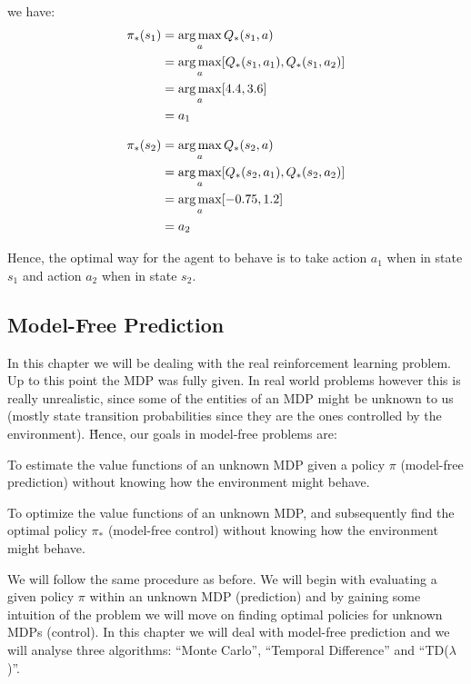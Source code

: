 we have:
\begin{align*}
\pi_*(s_1) &= \operatorname*{arg\,max}_{a} Q_*(s_1,a) \\
&= \operatorname*{arg\,max}_{a} [Q_*(s_1,a_1), Q_*(s_1,a_2)] \\
&= \operatorname*{arg\,max}_{a} [4.4, 3.6] \\
&= a_1
\end{align*}

\vspace{-15pt}

\begin{align*}
\pi_*(s_2) &= \operatorname*{arg\,max}_{a} Q_*(s_2,a) \\
&= \operatorname*{arg\,max}_{a} [Q_*(s_2,a_1), Q_*(s_2,a_2)] \\
&= \operatorname*{arg\,max}_{a} [-0.75, 1.2] \\
&= a_2
\end{align*}

Hence, the optimal way for the agent to behave is to take action $a_1$ when in state $s_1$ and action $a_2$ when in
state $s_2$.

\subsection{Model-Free Prediction}

In this chapter we will be dealing with the real reinforcement learning problem. Up to this point the MDP was fully
given. In real world problems however this is really unrealistic, since some of the entities of an MDP might be
unknown to us (mostly state transition probabilities since they are the ones controlled by the environment). \v

Hence, our goals in model-free problems are:
\bit
\item To estimate the value functions of an unknown MDP given a policy $\pi$ (model-free prediction) without knowing
how the environment might behave.
\item To optimize the value functions of an unknown MDP, and subsequently find the optimal policy $\pi_*$ (model-free
control) without knowing how the environment might behave.
\eit

We will follow the same procedure as before. We will begin with evaluating a given policy $\pi$ within an unknown MDP
(prediction) and by gaining some intuition of the problem we will move on finding optimal policies for unknown MDPs
(control). In this chapter we will deal with model-free prediction and we will analyse three algorithms: ``Monte
Carlo'', ``Temporal Difference'' and ``TD($\lambda$)''.

